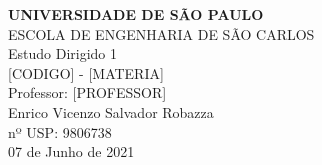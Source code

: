 \documentclass[12pt]{article}
\begin{document}
\setlength{\droptitle}{45mm}    
\begin{titlepage}
\begin{center}
\uppercase{
\textbf{Universidade de São Paulo}\\
\textsc{Escola de Engenharia de São Carlos}
}
\hspace{5mm}\\[6cm]
\Huge{Estudo Dirigido 1}\\[1cm]
\Large{[CODIGO] - [MATERIA]\\ Professor: [PROFESSOR]}\\[5cm]

\large{ 
\hspace*{\fill} Enrico Vicenzo Salvador Robazza\\ 
\hspace*{\fill} nº USP: 9806738\\[3cm]
07 de Junho de 2021
}
\end{center}
\end{titlepage}
\end{document}
